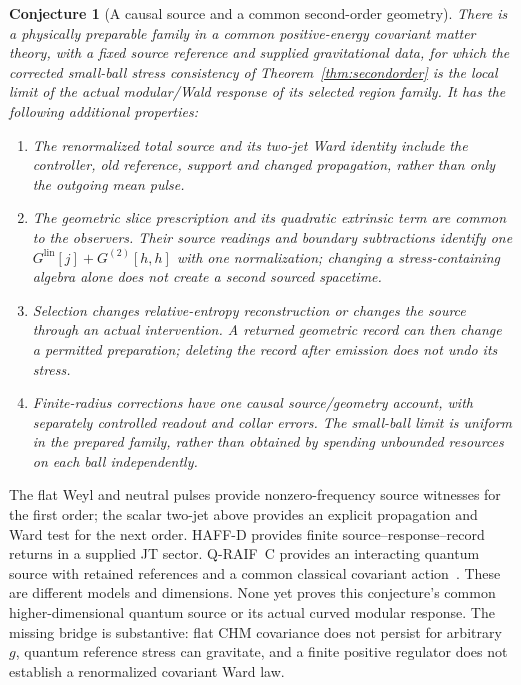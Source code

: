 \documentclass[12pt]{article}
\newtheorem{conjecture}[theorem]{Conjecture}
\theoremstyle{definition}
\theoremstyle{remark}
\begin{document}
\begin{conjecture}[A causal source and a common second-order geometry]
\label{conj:secondorder-common}
There is a physically preparable family in a common positive-energy
covariant matter theory, with a fixed source reference and supplied
gravitational data, for which the corrected small-ball stress consistency
of Theorem~\ref{thm:secondorder} is the local limit of the actual
modular/Wald response of its selected region family. It has the following
additional properties:
\begin{enumerate}[leftmargin=2em,itemsep=1pt]
\item The renormalized total source and its two-jet Ward identity include
the controller, old reference, support and changed propagation, rather
than only the outgoing mean pulse.
\item The geometric slice prescription and its quadratic extrinsic term
are common to the observers. Their source readings and boundary
subtractions identify one $G^{\mathrm{lin}}[j]+G^{(2)}[h,h]$ with one
normalization; changing a stress-containing algebra alone does not create
a second sourced spacetime.
\item Selection changes relative-entropy reconstruction or changes the
source through an actual intervention. A returned geometric record can
then change a permitted preparation; deleting the record after emission
does not undo its stress.
\item Finite-radius corrections have one causal source/geometry account,
with separately controlled readout and collar errors. The small-ball
limit is uniform in the prepared family, rather than obtained by spending
unbounded resources on each ball independently.
\end{enumerate}
\end{conjecture}

The flat Weyl and neutral pulses provide nonzero-frequency source
witnesses for the first order; the scalar two-jet above provides an
explicit propagation and Ward test for the next order. HAFF-D provides
finite source--response--record returns in a supplied JT sector.
Q-RAIF~C provides an interacting quantum source with retained references
and a common classical covariant action~\cite{QRC}. These are different
models and dimensions. None yet proves this conjecture's common
higher-dimensional quantum source or its actual curved modular response.
The missing bridge is substantive: flat CHM covariance does not persist
for arbitrary $g$, quantum reference stress can gravitate, and a finite
positive regulator does not establish a renormalized covariant Ward law.
\end{document}
